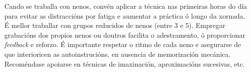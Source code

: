 \documentclass[a4paper,11pt]{article}
\begin{document}
Cando se traballa con nenos, convén aplicar a técnica nas primeiras horas do día para evitar as distraccións por fatiga e aumentar a práctica ó longo da xornada. É mellor traballar con grupos reducidos de nenos (entre 3 e 5). Empregar grabacións dos propios nenos ou doutros facilita o adestramento, ó proporcionar \textit{feedback} e reforzo. É importante respetar o ritmo de cada neno e asegurarse de que interioricen as autoinstrucións, en ausencia de memorización mecánica. Recoméndase apoiarse en técnicas de imaxinación, aproximacións sucesivas, etc.
\end{document}
